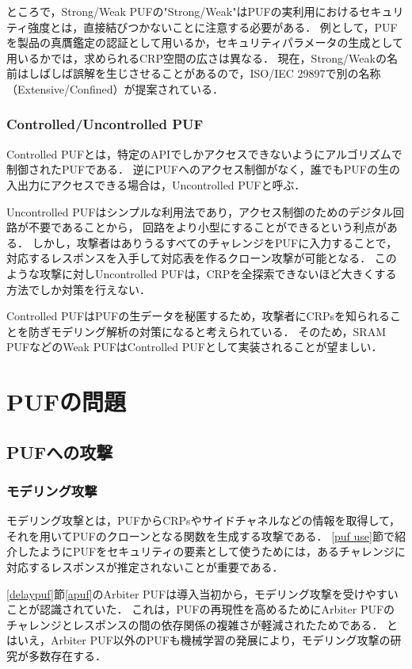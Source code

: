 \documentclass[technicalreport]{ieicej} %
\begin{document}
ところで，Strong/Weak PUFの"Strong/Weak"はPUFの実利用におけるセキュリティ強度とは，直接結びつかないことに注意する必要がある．
例として，PUFを製品の真贋鑑定の認証として用いるか，セキュリティパラメータの生成として用いるかでは，求められるCRP空間の広さは異なる．
現在，Strong/Weakの名前はしばしば誤解を生じさせることがあるので，ISO/IEC 29897で別の名称（Extensive/Confined）が提案されている\cite{hori-nedo}．

\subsubsection{Controlled/Uncontrolled PUF}
Controlled PUFとは，特定のAPIでしかアクセスできないようにアルゴリズムで制御されたPUFである\cite{gassend-cpuf1}\cite{gassend-cpuf2}．
逆にPUFへのアクセス制御がなく，誰でもPUFの生の入出力にアクセスできる場合は，Uncontrolled PUFと呼ぶ．

Uncontrolled PUFはシンプルな利用法であり，アクセス制御のためのデジタル回路が不要であることから，
回路をより小型にすることができるという利点がある\cite{sugatake}．
しかし，攻撃者はありうるすべてのチャレンジをPUFに入力することで，対応するレスポンスを入手して対応表を作るクローン攻撃が可能となる．
このような攻撃に対しUncontrolled PUFは，CRPを全探索できないほど大きくする方法でしか対策を行えない．

Controlled PUFはPUFの生データを秘匿するため，攻撃者にCRPsを知られることを防ぎモデリング解析の対策になると考えられている．
そのため，SRAM PUFなどのWeak PUFはControlled PUFとして実装されることが望ましい．

\section{PUFの問題}
\label{pufpro}
\subsection{PUFへの攻撃}
\subsubsection{モデリング攻撃}
モデリング攻撃とは，PUFからCRPsやサイドチャネルなどの情報を取得して，それを用いてPUFのクローンとなる関数を生成する攻撃である．
\ref{puf use}節で紹介したようにPUFをセキュリティの要素として使うためには，あるチャレンジに対応するレスポンスが推定されないことが重要である．

\ref{delaypuf}節\ref{apuf}のArbiter PUFは導入当初から，モデリング攻撃を受けやすいことが認識されていた\cite{maes1}\cite{lim}．
これは，PUFの再現性を高めるためにArbiter PUFのチャレンジとレスポンスの間の依存関係の複雑さが軽減されたためである．
とはいえ，Arbiter PUF以外のPUFも機械学習の発展により，モデリング攻撃の研究が多数存在する．
\end{document}
